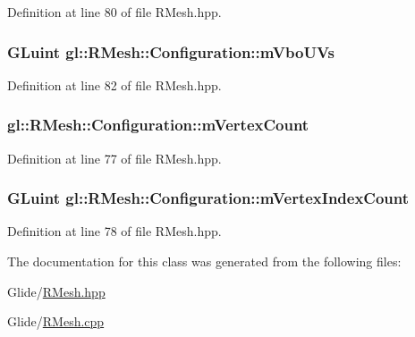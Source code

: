 Definition at line 80 of file R\-Mesh.\-hpp.

\hypertarget{classgl_1_1_r_mesh_1_1_configuration_a1dbf1ac4b9cf4099d7bb153cc45dac73}{
\subsubsection[{m\-Vbo\-U\-Vs}]{\setlength{\rightskip}{0pt plus 5cm}G\-Luint gl\-::\-R\-Mesh\-::\-Configuration\-::m\-Vbo\-U\-Vs}}\label{classgl_1_1_r_mesh_1_1_configuration_a1dbf1ac4b9cf4099d7bb153cc45dac73}


Definition at line 82 of file R\-Mesh.\-hpp.

\hypertarget{classgl_1_1_r_mesh_1_1_configuration_ad3c135218126bd3aef6c177a479e6b98}{
\subsubsection[{m\-Vertex\-Count}]{ gl\-::\-R\-Mesh\-::\-Configuration\-::m\-Vertex\-Count}}\label{classgl_1_1_r_mesh_1_1_configuration_ad3c135218126bd3aef6c177a479e6b98}


Definition at line 77 of file R\-Mesh.\-hpp.

\hypertarget{classgl_1_1_r_mesh_1_1_configuration_a9c44c3555d5f1b258df8fa2792750ea2}{
\subsubsection[{m\-Vertex\-Index\-Count}]{\setlength{\rightskip}{0pt plus 5cm}G\-Luint gl\-::\-R\-Mesh\-::\-Configuration\-::m\-Vertex\-Index\-Count}}\label{classgl_1_1_r_mesh_1_1_configuration_a9c44c3555d5f1b258df8fa2792750ea2}


Definition at line 78 of file R\-Mesh.\-hpp.



The documentation for this class was generated from the following files\-:\begin{DoxyCompactItemize}
\item 
Glide/\hyperlink{_r_mesh_8hpp}{R\-Mesh.\-hpp}\item 
Glide/\hyperlink{_r_mesh_8cpp}{R\-Mesh.\-cpp}\end{DoxyCompactItemize}
